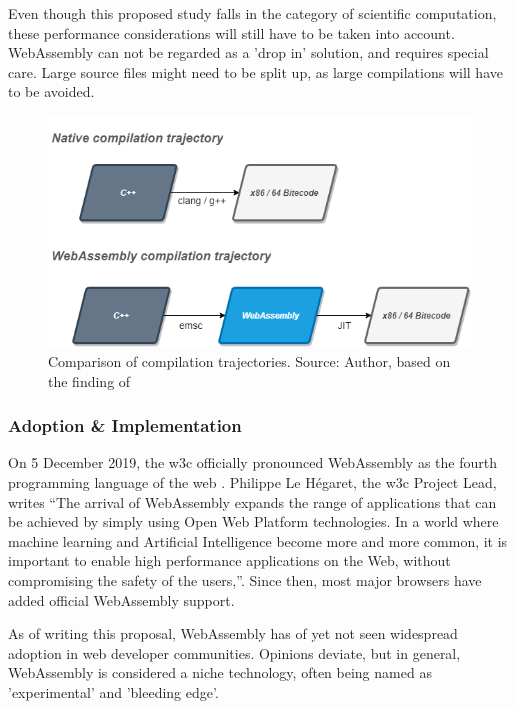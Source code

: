 Even though this proposed study falls in the category of scientific computation, these performance considerations will still have to be taken into account. WebAssembly can not be regarded as a 'drop in' solution, and requires special care. Large source files might need to be split up, as large compilations will have to be avoided.  

\begin{figure}[!tbp]
  \centering
  \begin{minipage}[b]{0.80\textwidth}
    \includegraphics[width=\textwidth]{../schemas/wasm-performance/wasm-perf.png}
    \caption{Comparison of compilation trajectories. Source: Author, based on the finding of \cite{jangda_not_2019}}
    \label{fig:wasm-trajectory}
  \end{minipage}
\end{figure}

\subsubsection*{Adoption \& Implementation}


On 5 December 2019, the \ac{w3c} officially pronounced WebAssembly as the fourth programming language of the web \cite{w3c_world_2019}. Philippe Le Hégaret, the \ac{w3c} Project Lead, writes “The arrival of WebAssembly expands the range of applications that can be achieved by simply using Open Web Platform technologies. In a world where machine learning and Artificial Intelligence become more and more common, it is important to enable high performance applications on the Web, without compromising the safety of the users,”. Since then, most major browsers have added official WebAssembly support.

As of writing this proposal, WebAssembly has of yet not seen widespread adoption in web developer communities. Opinions deviate, but in general, WebAssembly is considered a niche technology, often being named as 'experimental' and 'bleeding edge'. 

